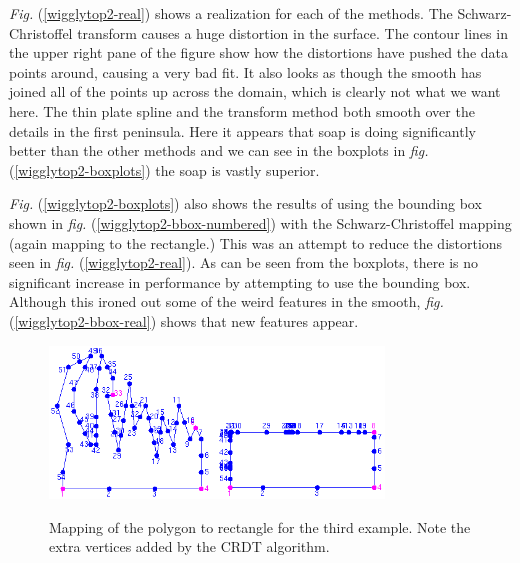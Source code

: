 \documentclass[a4paper,10pt]{amsart}
\newcommand{\sch}{Schwarz-Christoffel }
\newcommand{\fig}[1]{\emph{fig.} (\ref{#1})}
\newcommand{\Fig}[1]{\emph{Fig.} (\ref{#1})}
\begin{document}
\Fig{wigglytop2-real} shows a realization for each of the methods. The \sch transform causes a huge distortion in the surface. The contour lines in the upper right pane of the figure show how the distortions have pushed the data points around, causing a very bad fit. It also looks as though the smooth has joined all of the points up across the domain, which is clearly not what we want here. The thin plate spline and the transform method both smooth over the details in the first peninsula. Here it appears that soap is doing significantly better than the other methods and we can see in the boxplots in \fig{wigglytop2-boxplots} the soap is vastly superior.

\Fig{wigglytop2-boxplots} also shows the results of using the bounding box shown in \fig{wigglytop2-bbox-numbered} with the \sch mapping (again mapping to the rectangle.) This was an attempt to reduce the distortions seen in \fig{wigglytop2-real}. As can be seen from the boxplots, there is no significant increase in performance by attempting to use the bounding box. Although this ironed out some of the weird features in the smooth, \fig{wigglytop2-bbox-real} shows that new features appear.



\begin{figure}
\centering
\includegraphics[width=3.5in]{figs-otherdomains/wigglytop2-numbered.png} \\
\caption{Mapping of the polygon to rectangle for the third example. Note the extra vertices added by the CRDT algorithm.}
\label{wigglytop2-numbered}
\end{figure}
\end{document}
